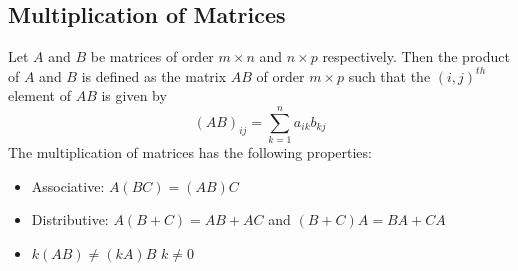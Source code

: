\documentclass{report}
\begin{document}
\begin{multicols}{2}
  \section{Multiplication of Matrices}
  Let $A$ and $B$ be matrices of order $m \times n$ and $n \times p$
  respectively. Then the product of $A$ and $B$ is defined as the matrix $AB$ of
  order $m \times p$ such that the $(i,j)^{th}$ element of $AB$ is given by
  \begin{equation*}
    (AB)_{ij} = \sum_{k=1}^n a_{ik}b_{kj}
  \end{equation*}
  The multiplication of matrices has the following properties:
  \begin{itemize}
    \item Associative: $A(BC) = (AB)C$
    \item Distributive: $A(B+C) = AB + AC$ and $(B+C)A = BA + CA$
    \item $k(AB) \neq (kA)B$  $k \neq 0$
  \end{itemize}

\end{multicols}
\end{document}

